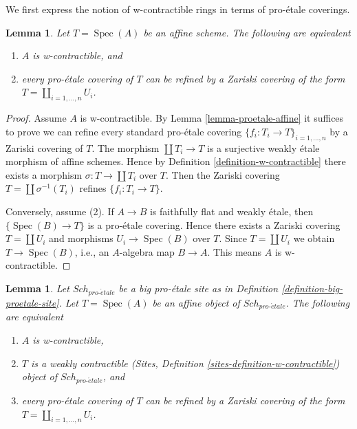 \documentclass{stacks-project}
\theoremstyle{plain}
\newtheorem{lemma}[subsection]{Lemma}
\theoremstyle{definition}
\theoremstyle{remark}
\numberwithin{equation}{subsection}
\def\Spec{\mathop{\mathrm{Spec}}}
\def\Sch{\mathit{Sch}}
\def\proetale{{pro\text{-}\acute{e}tale}}
\begin{document}
\noindent
We first express the notion of w-contractible rings in terms of
pro-\'etale coverings.

\begin{lemma}
\label{lemma-w-contractible-proetale-cover}
Let $T = \Spec(A)$ be an affine scheme. The following are equivalent
\begin{enumerate}
\item $A$ is w-contractible, and
\item every pro-\'etale covering of $T$ can be refined by
a Zariski covering of the form $T = \coprod_{i = 1, \ldots, n} U_i$.
\end{enumerate}
\end{lemma}

\begin{proof}
Assume $A$ is w-contractible. By Lemma \ref{lemma-proetale-affine}
it suffices to prove we can refine every standard pro-\'etale covering
$\{f_i : T_i \to T\}_{i = 1, \ldots, n}$ by a Zariski covering of $T$.
The morphism $\coprod T_i \to T$ is a surjective weakly \'etale morphism
of affine schemes. Hence by Definition \ref{definition-w-contractible}
there exists a morphism $\sigma : T \to \coprod T_i$ over $T$.
Then the Zariski covering $T = \coprod \sigma^{-1}(T_i)$
refines $\{f_i : T_i \to T\}$.

\medskip\noindent
Conversely, assume (2). If $A \to B$ is faithfully flat and weakly \'etale,
then $\{\Spec(B) \to T\}$ is a pro-\'etale covering.
Hence there exists a Zariski covering $T = \coprod U_i$
and morphisms $U_i \to \Spec(B)$ over $T$. Since $T = \coprod U_i$
we obtain $T \to \Spec(B)$, i.e., an $A$-algebra map $B \to A$.
This means $A$ is w-contractible.
\end{proof}

\begin{lemma}
\label{lemma-w-contractible-is-weakly-contractible}
Let $\Sch_\proetale$ be a big pro-\'etale site as in
Definition \ref{definition-big-proetale-site}.
Let $T = \Spec(A)$ be an affine object of $\Sch_\proetale$.
The following are equivalent
\begin{enumerate}
\item $A$ is w-contractible,
\item $T$ is a weakly contractible
(Sites, Definition \ref{sites-definition-w-contractible})
object of $\Sch_\proetale$, and
\item every pro-\'etale covering of $T$ can be refined by
a Zariski covering of the form $T = \coprod_{i = 1, \ldots, n} U_i$.
\end{enumerate}
\end{lemma}
\end{document}
